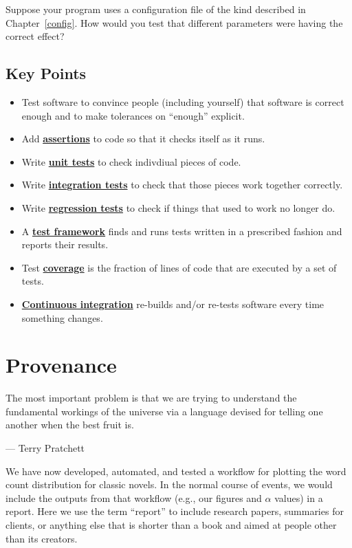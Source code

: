 \documentclass[
]{krantz}
\providecommand{\tightlist}{%
  \setlength{\itemsep}{0pt}\setlength{\parskip}{0pt}}
\renewenvironment{quote}{\begin{VF}}{\end{VF}}
\newcommand{\gref}[2]{\hyperlink{#2}{\textbf{#1}}}
\begin{document}
Suppose your program uses a configuration file of the kind described in Chapter~\ref{config}.
How would you test that different parameters were having the correct effect?

\hypertarget{testing-keypoints}{%
\section{Key Points}\label{testing-keypoints}}

\begin{itemize}
\tightlist
\item
  Test software to convince people (including yourself) that software is correct enough
  and to make tolerances on ``enough'' explicit.
\item
  Add \gref{assertions}{assertion} to code so that it checks itself as it runs.
\item
  Write \gref{unit tests}{unit\_test} to check indivdiual pieces of code.
\item
  Write \gref{integration tests}{integration\_test} to check that those pieces work together correctly.
\item
  Write \gref{regression tests}{regression\_testing} to check if things that used to work no longer do.
\item
  A \gref{test framework}{test\_framework} finds and runs tests written in a prescribed fashion and reports their results.
\item
  Test \gref{coverage}{code\_coverage} is the fraction of lines of code that are executed by a set of tests.
\item
  \gref{Continuous integration}{continuous\_integration} re-builds and/or re-tests software every time something changes.
\end{itemize}

\hypertarget{provenance}{%
\chapter{Provenance}\label{provenance}}

\begin{quote}
The most important problem is that we are trying to understand the fundamental workings of the universe
via a language devised for telling one another when the best fruit is.

--- Terry Pratchett
\end{quote}

We have now developed, automated, and tested
a workflow for plotting the word count distribution for classic novels.
In the normal course of events,
we would include the outputs from that workflow (e.g., our figures and \(\alpha\) values)
in a report.
Here we use the term ``report'' to include research papers,
summaries for clients,
or anything else that is shorter than a book
and aimed at people other than its creators.
\end{document}
